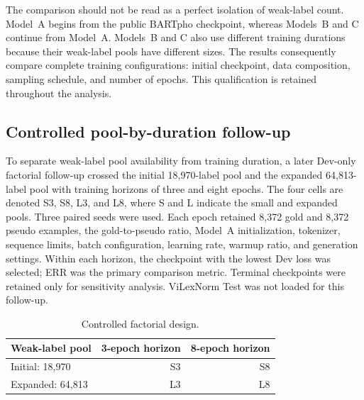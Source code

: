 \documentclass[11pt]{article}
\begin{document}
The comparison should not be read as a perfect isolation of weak-label count. Model~A begins from the public BARTpho checkpoint, whereas Models~B and C continue from Model~A. Models~B and C also use different training durations because their weak-label pools have different sizes. The results consequently compare complete training configurations: initial checkpoint, data composition, sampling schedule, and number of epochs. This qualification is retained throughout the analysis.

\subsection{Controlled pool-by-duration follow-up}

To separate weak-label pool availability from training duration, a later Dev-only factorial follow-up crossed the initial 18,970-label pool and the expanded 64,813-label pool with training horizons of three and eight epochs. The four cells are denoted S3, S8, L3, and L8, where S and L indicate the small and expanded pools. Three paired seeds were used. Each epoch retained 8,372 gold and 8,372 pseudo examples, the gold-to-pseudo ratio, Model~A initialization, tokenizer, sequence limits, batch configuration, learning rate, warmup ratio, and generation settings. Within each horizon, the checkpoint with the lowest Dev loss was selected; ERR was the primary comparison metric. Terminal checkpoints were retained only for sensitivity analysis. ViLexNorm Test was not loaded for this follow-up.

\begin{table}[t]
\centering
\caption{Controlled factorial design.}
\label{tab:factorial-design}
\begin{tabular}{lrr}
\toprule
Weak-label pool & 3-epoch horizon & 8-epoch horizon \\
\midrule
Initial: 18,970 & S3 & S8 \\
Expanded: 64,813 & L3 & L8 \\
\bottomrule
\end{tabular}
\end{table}
\end{document}
